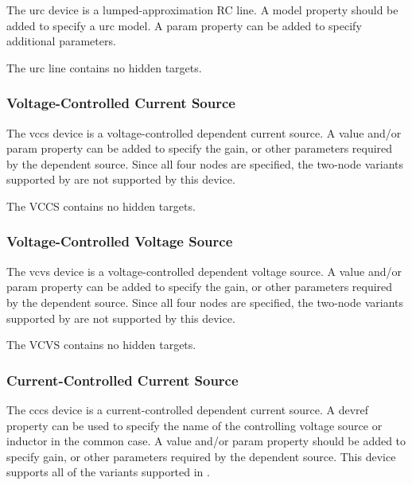 The {\et urc} device is a lumped-approximation RC line.  A {\et model}
property should be added to specify a urc model.  A {\et param}
property can be added to specify additional parameters.

The {\et urc} line contains no hidden targets.

\subsubsection{Voltage-Controlled Current Source}

The {\et vccs} device is a voltage-controlled dependent current
source.  A {\et value} and/or {\et param} property can be added to
specify the gain, or other parameters required by the dependent
source.  Since all four nodes are specified, the two-node variants
supported by {\WRspice} are not supported by this device.

The VCCS contains no hidden targets.

\subsubsection{Voltage-Controlled Voltage Source}

The {\et vcvs} device is a voltage-controlled dependent voltage
source.  A {\et value} and/or {\et param} property can be added to
specify the gain, or other parameters required by the dependent
source.  Since all four nodes are specified, the two-node variants
supported by {\WRspice} are not supported by this device.

The VCVS contains no hidden targets.

\subsubsection{Current-Controlled Current Source}

The {\et cccs} device is a current-controlled dependent current
source.  A {\et devref} property can be used to specify the name of
the controlling voltage source or inductor in the common case.  A {\et
value} and/or {\et param} property should be added to specify gain, or
other parameters required by the dependent source.  This device
supports all of the variants supported in {\WRspice}.

